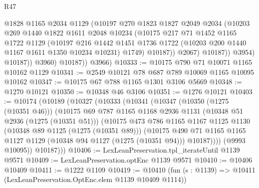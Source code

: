 \begin{lexlean}{R47}
\begin{coremodule}
                      @1828
                      @1165
                      @2034
                      @1129
                      (@10197
                        @270
                        @1823
                        @1827
                        @2049
                        @2034
                        (@10203
                          @269
                          @1440
                          @1822
                          @1611
                          @2048
                          @10234
                          (@10175
                            @217
                            @71
                            @1452
                            @1165
                            @1722
                            @1129
                            (@10197
                              @216
                              @1442
                              @1451
                              @1736
                              @1722
                              (@10203 @200 @1440 @1167 @1611 @1350 @10234 @10231)
                              @1749)
                            @10187))
                        @2067)
                      @10187))
                  @3954)
                @10187))
            @3960)
          @10187))
      @3966)
@10333 := @10175 @790 @71 @10071 @1165 @10162 @1129
@10341 := @2549 @10121 @78 @687 @789 @10069 @1165 @10095 @10162
@10347 := @10175 @67 @788 @1165 @1301 @3106 @5669
@10348 := @1270 @10121
@10350 := @10348 @46 @3106
@10351 := @1276 @10121
@10403 := @10174
    (@10189
      (@10327
        (@10333
          (@10341
            (@10347
              (@10350 (@1275 (@10351 @46)))
              (@10175
                @69
                @787
                @1165
                @1168
                @2936
                @1131
                (@10348 @51 @2936 (@1275 (@10351 @51)))
                (@10175
                  @473
                  @786
                  @1165
                  @1167
                  @1125
                  @1130
                  (@10348 @89 @1125 (@1275 (@10351 @89)))
                  (@10175
                    @490
                    @71
                    @1165
                    @1165
                    @1127
                    @1129
                    (@10348 @94 @1127 (@1275 (@10351 @94)))
                    @10187))))
            (@9993 @10095))
          @10187)))
@10406 := LexLeanPreservation.tpl_iterateUntil @1139 @9571
@10409 := LexLeanPreservation.optEnc @1139 @9571
@10410 := @10406 @10409
@10411 := @1222 @1109
@10419 := @10410
    (fun (s : @1139) => @10411 (LexLeanPreservation.OptEnc.elem @1139 @10409 @1114))

\end{coremodule}
\end{lexlean}
